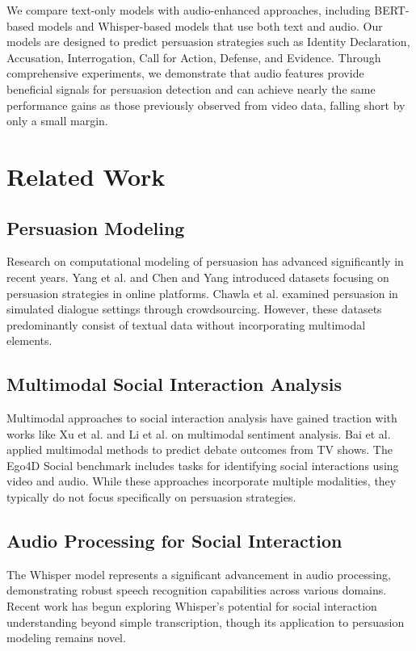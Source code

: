 \documentclass{article}
\begin{document}
We compare text-only models with audio-enhanced approaches, including BERT-based models and Whisper-based models that use both text and audio. Our models are designed to predict persuasion strategies such as Identity Declaration, Accusation, Interrogation, Call for Action, Defense, and Evidence. Through comprehensive experiments, we demonstrate that audio features provide beneficial signals for persuasion detection and can achieve nearly the same performance gains as those previously observed from video data, falling short by only a small margin.

\section{Related Work}
\subsection{Persuasion Modeling}
Research on computational modeling of persuasion has advanced significantly in recent years. Yang et al. \cite{yang2019let} and Chen and Yang \cite{chen2021advisorqagc} introduced datasets focusing on persuasion strategies in online platforms. Chawla et al. \cite{chawla2021casino} examined persuasion in simulated dialogue settings through crowdsourcing. However, these datasets predominantly consist of textual data without incorporating multimodal elements.

\subsection{Multimodal Social Interaction Analysis}
Multimodal approaches to social interaction analysis have gained traction with works like Xu et al. \cite{xu2021learning} and Li et al. \cite{li2020deep} on multimodal sentiment analysis. Bai et al. \cite{bai2021power} applied multimodal methods to predict debate outcomes from TV shows. The Ego4D Social benchmark \cite{grauman2022ego4d} includes tasks for identifying social interactions using video and audio. While these approaches incorporate multiple modalities, they typically do not focus specifically on persuasion strategies.

\subsection{Audio Processing for Social Interaction}
The Whisper model \cite{radford2022robust} represents a significant advancement in audio processing, demonstrating robust speech recognition capabilities across various domains. Recent work has begun exploring Whisper's potential for social interaction understanding beyond simple transcription, though its application to persuasion modeling remains novel.
\end{document}
